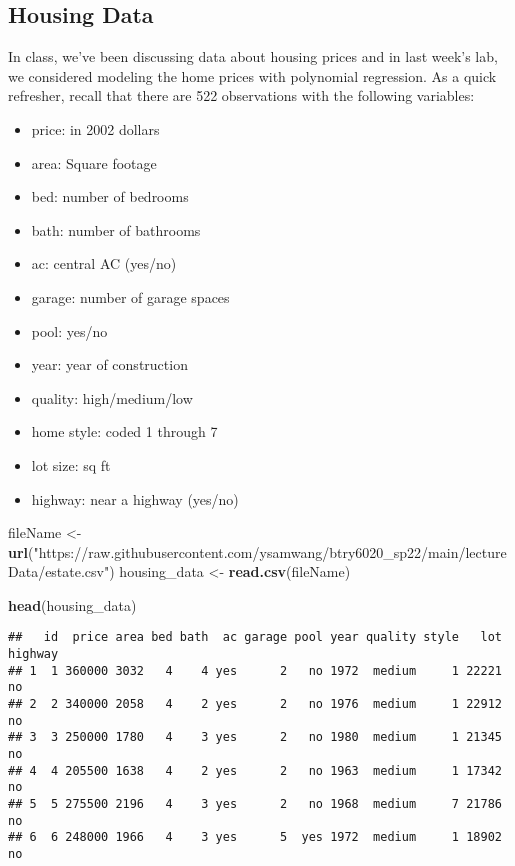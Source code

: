 \documentclass[
]{article}
\newenvironment{Shaded}{\begin{snugshade}}{\end{snugshade}}
\newcommand{\FunctionTok}[1]{\textcolor[rgb]{0.13,0.29,0.53}{\textbf{#1}}}
\newcommand{\NormalTok}[1]{#1}
\newcommand{\OtherTok}[1]{\textcolor[rgb]{0.56,0.35,0.01}{#1}}
\newcommand{\StringTok}[1]{\textcolor[rgb]{0.31,0.60,0.02}{#1}}
\providecommand{\tightlist}{%
  \setlength{\itemsep}{0pt}\setlength{\parskip}{0pt}}
\begin{document}
\newpage

\subsection{Housing Data}\label{housing-data}

In class, we've been discussing data about housing prices and in last
week's lab, we considered modeling the home prices with polynomial
regression. As a quick refresher, recall that there are 522 observations
with the following variables:

\begin{itemize}
\tightlist
\item
  price: in 2002 dollars
\item
  area: Square footage
\item
  bed: number of bedrooms
\item
  bath: number of bathrooms
\item
  ac: central AC (yes/no)
\item
  garage: number of garage spaces
\item
  pool: yes/no
\item
  year: year of construction
\item
  quality: high/medium/low
\item
  home style: coded 1 through 7
\item
  lot size: sq ft
\item
  highway: near a highway (yes/no)
\end{itemize}

\begin{Shaded}
\begin{Highlighting}[]
\NormalTok{fileName }\OtherTok{\textless{}{-}} \FunctionTok{url}\NormalTok{(}\StringTok{"https://raw.githubusercontent.com/ysamwang/btry6020\_sp22/main/lectureData/estate.csv"}\NormalTok{)}
\NormalTok{housing\_data }\OtherTok{\textless{}{-}} \FunctionTok{read.csv}\NormalTok{(fileName)}

\FunctionTok{head}\NormalTok{(housing\_data)}
\end{Highlighting}
\end{Shaded}

\begin{verbatim}
##   id  price area bed bath  ac garage pool year quality style   lot highway
## 1  1 360000 3032   4    4 yes      2   no 1972  medium     1 22221      no
## 2  2 340000 2058   4    2 yes      2   no 1976  medium     1 22912      no
## 3  3 250000 1780   4    3 yes      2   no 1980  medium     1 21345      no
## 4  4 205500 1638   4    2 yes      2   no 1963  medium     1 17342      no
## 5  5 275500 2196   4    3 yes      2   no 1968  medium     7 21786      no
## 6  6 248000 1966   4    3 yes      5  yes 1972  medium     1 18902      no
\end{verbatim}
\end{document}
